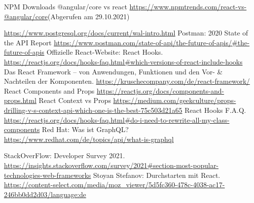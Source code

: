 \begin{thebibliography}{HR08}
 NPM Downloads @angular/core vs react \url{https://www.npmtrends.com/react-vs-@angular/core}(Abgerufen am 29.10.2021)

 \url{https://www.postgresql.org/docs/current/wal-intro.html}
Postman: 2020 State of the API Report \url{https://www.postman.com/state-of-api/the-future-of-apis/#the-future-of-apis}
 Offizielle React-Website: React Hooks. \url{https://reactjs.org/docs/hooks-faq.html#which-versions-of-react-include-hooks}
 Das React Framework – von Anwendungen, Funktionen und den Vor- \& Nachteilen der Komponenten. \url{https://kruschecompany.com/de/react-framework/}
 React Components and Props \url{https://reactjs.org/docs/components-and-props.html}
 React Context vs Props \url{https://medium.com/geekculture/props-drilling-v-s-context-api-which-one-is-the-best-75c503d21a65}
 React Hooks F.A.Q. \url{https://reactjs.org/docs/hooks-faq.html#do-i-need-to-rewrite-all-my-class-components}
Red Hat: Was ist GraphQL? \url{https://www.redhat.com/de/topics/api/what-is-graphql}

StackOverFlow: Developer Survey 2021. \url{https://insights.stackoverflow.com/survey/2021#section-most-popular-technologies-web-frameworks}
Stoyan Stefanov: Durchstarten mit React. \url{https://content-select.com/media/moz_viewer/5d5fc360-478c-4038-ac17-246bb0dd2d03/language:de}
\end{thebibliography}
